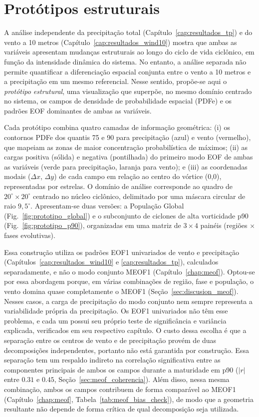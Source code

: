 \chapter{Protótipos estruturais}\label{cap:prototipos}


A análise independente da precipitação total (Capítulo~\ref{cap:resultados_tp}) e do vento a 10 metros (Capítulo~\ref{cap:resultados_wind10}) mostra que ambas as variáveis apresentam mudanças estruturais ao longo do ciclo de vida ciclônico, em função da intensidade dinâmica do sistema.
No entanto, a análise separada não permite quantificar a diferenciação espacial conjunta entre o vento a 10 metros e a precipitação em um mesmo referencial.
Nesse sentido, propõe-se aqui o \textit{protótipo estrutural}, uma visualização que superpõe, no mesmo domínio centrado no sistema, os campos de densidade de probabilidade espacial (PDFe) e os padrões EOF dominantes de ambas as variáveis.

Cada protótipo combina quatro camadas de informação geométrica: (i) os contornos PDFe dos quantis 75 e 90 para precipitação (azul) e vento (vermelho), que mapeiam as zonas de maior concentração probabilística de máximos; (ii) as cargas positiva (sólida) e negativa (pontilhada) do primeiro modo EOF de ambas as variáveis (verde para precipitação, laranja para vento); e (iii) as coordenadas modais ($\Delta x$, $\Delta y$) de cada campo em relação ao centro do vórtice (0,0), representadas por estrelas.
O domínio de análise corresponde ao quadro de $20^{\circ} \times 20^{\circ}$ centrado no núcleo ciclônico, delimitado por uma máscara circular de raio $9{,}5^{\circ}$.
Apresentam-se duas versões: a População Global (Fig.~\ref{fig:prototipo_global}) e o subconjunto de ciclones de alta vorticidade p90 (Fig.~\ref{fig:prototipo_p90}), organizadas em uma matriz de $3 \times 4$ painéis (regiões $\times$ fases evolutivas).

Essa construção utiliza os padrões EOF1 univariados de vento e precipitação (Capítulos~\ref{cap:resultados_wind10} e \ref{cap:resultados_tp}), calculados separadamente, e não o modo conjunto MEOF1 (Capítulo~\ref{chap:meof}).
Optou-se por essa abordagem porque, em várias combinações de região, fase e população, o vento domina quase completamente o MEOF1 (Seção~\ref{sec:discusion_meof}).
Nesses casos, a carga de precipitação do modo conjunto nem sempre representa a variabilidade própria da precipitação.
Os EOF1 univariados não têm esse problema, e cada um possui seu próprio teste de significância e variância explicada, verificados em seu respectivo capítulo.
O custo dessa escolha é que a separação entre os centros de vento e de precipitação provém de duas decomposições independentes, portanto não está garantida por construção.
Essa separação tem um respaldo indireto na correlação significativa entre as componentes principais de ambos os campos durante a maturidade em p90 ($|r|$ entre $0.31$ e $0.45$, Seção~\ref{sec:meof_coherencia}).
Além disso, nessa mesma combinação, ambos os campos contribuem de forma comparável ao MEOF1 (Capítulo~\ref{chap:meof},
Tabela~\ref{tab:meof_bias_check}), de modo que a geometria resultante não depende de forma crítica de qual decomposição seja utilizada.


